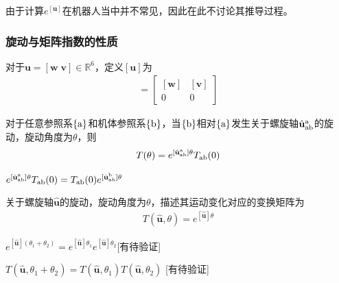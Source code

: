 \documentclass[12pt, a4paper, article, UTF8]{ctexart}
\begin{document}
由于计算$e^{[\mathbf{u}]}$在机器人当中并不常见，因此在此不讨论其推导过程。

\subsubsection{旋动与矩阵指数的性质}
\begin{mydefinition}
对于$\mathbf{u} = [\mathbf{w}\; \mathbf{v}]\in\mathbb{R}^6$，定义$[\mathbf{u}]$为
\begin{align*}
[\mathbf{u}] = \begin{bmatrix}
[\mathbf{w}] & [\mathbf{v}]\\
0 & 0
\end{bmatrix}
\end{align*}
\end{mydefinition}

\begin{mytheorem}
对于任意参照系$\{\textnormal{a}\}$和机体参照系$\{\textnormal{b}\}$，当$\{\textnormal{b}\}$相对$\{\textnormal{a}\}$发生关于螺旋轴$\hat{\mathbf{u}}_\textnormal{ab}^\textnormal{a}$的旋动，旋动角度为$\theta$，则
\begin{align*}
T(\theta)=e^{[\hat{\mathbf{u}}_\textnormal{ab}^\textnormal{a}]\theta}T_\textnormal{ab}(0) 
\end{align*} \label{th:transformationexponential}
\end{mytheorem}

\begin{mytheorem}
$e^{[\hat{\mathbf{u}}_\textnormal{ab}^\textnormal{a}]\theta}T_\textnormal{ab}(0) = T_\textnormal{ab}(0)e^{[\hat{\mathbf{u}}_\textnormal{ab}^\textnormal{b}]\theta}$ \label{th:transformationexponentialbodyframe}
\end{mytheorem}

\begin{mytheorem}
关于螺旋轴$\hat{\mathbf{u}}$的旋动，旋动角度为$\theta$，描述其运动变化对应的变换矩阵为
\begin{align*}
T(\hat{\mathbf{u}}, \theta)=e^{[\hat{\mathbf{u}}]\theta}
\end{align*}
\end{mytheorem}

\begin{mytheorem}
$e^{[\hat{\mathbf{u}}](\theta_1+\theta_2)} = e^{[\hat{\mathbf{u}}]\theta_1}e^{[\hat{\mathbf{u}}]\theta_2}$[有待验证]
\end{mytheorem}

\begin{mytheorem}
$T(\hat{\mathbf{u}}, \theta_1+\theta_2) =T(\hat{\mathbf{u}}, \theta_1)T(\hat{\mathbf{u}}, \theta_2) $ [有待验证]
\end{mytheorem}
\end{document}

